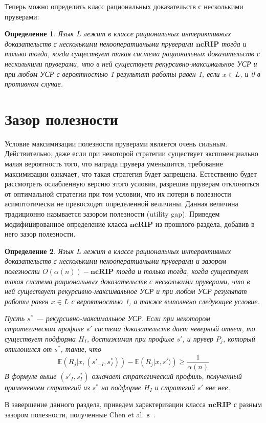 \documentclass[14pt, a4paper]{extreport}
\newtheorem{definition}{\indent Определение}
\begin{document}
        Теперь можно определить класс рациональных доказательств с несколькими пруверами:

        \begin{definition}
            Язык $L$ лежит в классе рациональных интерактивных доказательств с несколькими некооперативными пруверами $\textbf{ncRIP}$ тогда и только тогда, когда существует такая система рациональных доказательств с несколькими пруверами, что в ней существует рекурсивно-максимальное УСР и при любом УСР с вероятностью 1 результат работы равен 1, если $x \in L$, и 0 в противном случае.
        \end{definition}

        \section{Зазор полезности}
        Условие максимизации полезности пруверами является очень сильным. Действительно, даже если при некоторой стратегии существует экспоненциально малая вероятность того, что награда прувера уменьшится, требование максимизации означает, что такая стратегия будет запрещена. Естественно будет рассмотреть ослабленную версию этого условия, разрешив пруверам отклоняться от оптимальной стратегии при том условии, что их потери в полезности асимптотически не превосходят определенной величины. Данная величина традиционно называется зазором полезности (utility gap). Приведем модифицированное определение класса $\textbf{ncRIP}$ из прошлого раздела, добавив в него зазор полезности.

\begin{definition}
    Язык $L$ лежит в классе рациональных интерактивных доказательств с несколькими некооперативными пруверами и зазором полезности $O(\alpha(n))-\textbf{ncRIP}$ тогда и только тогда, когда существует такая система рациональных доказательств с несколькими пруверами, что в ней существует рекурсивно-максимальное УСР и при любом УСР результат работы равен $x \in L$ с вероятностью 1, а также выполнено следующее условие.

    Пусть $s^*$ --- рекурсивно-максимальное УСР. Если при некотором стратегическом профиле $s'$ система доказательств дает неверный ответ, то существует подформа $H_I$, достижимая при профиле $s'$, и прувер $P_j$, который отклонился от $s^*$, такие, что
    \[\mathbb{E}\left(R_j|x, (s'_{-I}, s^*_I)\right) - \mathbb{E}\left(R_j|x, s')\right) \geqslant \frac{1}{\alpha(n)}\]
    В формуле выше $(s'_I, s^*_I)$ означает стратегический профиль, полученный применением стратегий из $s^*$ на подформе $H_I$ и стратегий $s'$ вне нее.
\end{definition}
        В завершение данного раздела, приведем характеризации класса $\textbf{ncRIP}$ с разным зазором полезности, полученные Chen et al. в~\cite{chen2017noncoop}.
\end{document}

